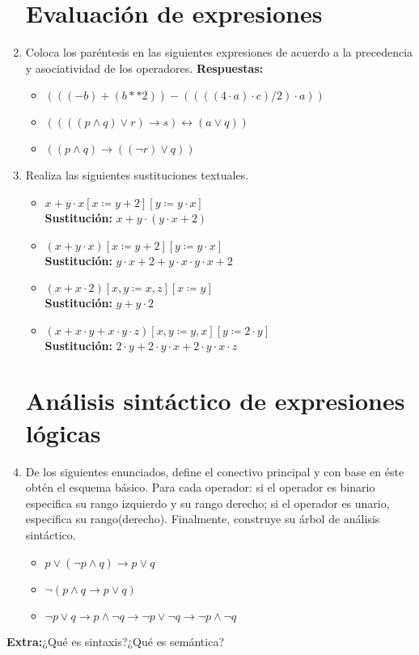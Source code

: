 \documentclass{article}
\begin{document}
\begin{enumerate}
\section*{Evaluación de expresiones}
	\item{Coloca los paréntesis en las siguientes expresiones de acuerdo a la precedencia y asociatividad de los operadores.}
		\textbf{\large Respuestas:}\normalsize    
		\begin{itemize}
			\item{$(((-b) + (b ** 2)) - ((((4 \cdot a) \cdot c) / 2) \cdot a))$}
			\item{$((((p \wedge q) \vee r) \rightarrow s) \leftrightarrow (a \vee q))$}
			\item{$((p \wedge q) \rightarrow ((\neg r) \vee q))$}
		\end{itemize}
	\item{Realiza las siguientes sustituciones textuales.}
		\begin{itemize}
			\item{$x + y \cdot x [x \coloneqq y + 2][y \coloneqq y \cdot x] $}\\
			\textbf{Sustitución:} $x + y \cdot (y \cdot x +2)$\\
			\item{$(x + y \cdot x) [x \coloneqq y + 2][y \coloneqq y \cdot x] $}\\
			\textbf{Sustitución:} $y \cdot x + 2 + y \cdot x \cdot y \cdot x + 2$\\
			\item{$(x + x \cdot 2)[x,y \coloneqq x, z][x \coloneqq y] $}\\
			\textbf{Sustitución:} $y + y \cdot 2 $\\
			\item{$(x + x \cdot y + x \cdot y \cdot z)[x,y \coloneqq y,x][y \coloneqq 2 \cdot y]$}\\	
			\textbf{Sustitución:} $2 \cdot y + 2 \cdot y \cdot x + 2 \cdot y \cdot x \cdot z $
		\end{itemize}
\section*{Análisis sintáctico de expresiones lógicas}
	\item{De los siguientes enunciados, define el conectivo principal y con base en éste obtén el esquema básico. Para cada operador: si el operador es binario especifica su rango izquierdo y su rango derecho; si el operador es unario, especifica su rango(derecho). Finalmente, construye su árbol de análisis sintáctico.}
		\begin{itemize}
			\item {$p \vee (\neg p \wedge q) \rightarrow p \vee q$}
			\item {$\neg (p \wedge q \rightarrow p \vee q)$}
			\item {$\neg p \vee q \rightarrow p \wedge \neg q \rightarrow \neg p \vee \neg q \rightarrow \neg p \wedge \neg q$}

		\end{itemize}
\end{enumerate}

\textbf{Extra:}¿Qué es sintaxis?¿Qué es semántica?
\end{document}
